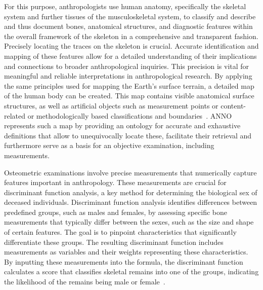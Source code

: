 \documentclass[sw]{iosart2x}
\begin{document}
For this purpose, anthropologists use human anatomy, specifically the skeletal system and further tissues of the musculoskeletal system, to classify and describe and thus document bones, anatomical structures, and diagnostic features within the overall framework of the skeleton in a comprehensive and transparent fashion.
Precisely locating the traces on the skeleton is crucial.
Accurate identification and mapping of these features allow for a detailed understanding of their implications and connections to broader anthropological inquiries.
This precision is vital for meaningful and reliable interpretations in anthropological research.
By applying the same principles used for mapping the Earth's surface terrain, a detailed map of the human body can be created.
This map contains visible anatomical surface structures, as well as artificial objects such as measurement points or content-related or methodologically based classifications and boundaries~\citep{topo}.
ANNO represents such a map by providing an ontology for accurate and exhaustive definitions that allow to unequivocally locate these, facilitate their retrieval and furthermore serve as a basis for an objective examination, including measurements.


Osteometric examinations involve precise measurements that numerically capture features important in anthropology.
These measurements are crucial for discriminant function analysis, a key method for determining the biological sex of deceased individuals.
Discriminant function analysis identifies differences between predefined groups, such as males and females, by assessing specific bone measurements that typically differ between the sexes, such as the size and shape of certain features.
The goal is to pinpoint characteristics that significantly differentiate these groups.
The resulting discriminant function includes measurements as variables and their weights representing these characteristics.
By inputting these measurements into the formula, the discriminant function calculates a score that classifies skeletal remains into one of the groups, indicating the likelihood of the remains being male or female~\citep{prehistoricanthropology}.
\end{document}
